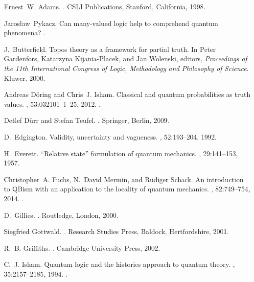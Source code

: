 \documentclass[12pt,reqno]{article}
\renewcommand{\(}{\left(}
\renewcommand{\)}{\right)}
\newcommand{\<}{\langle}
\renewcommand{\>}{\rangle}
\theoremstyle{plain} %
\begin{document}
\begin{thebibliography}{10}

Ernest~W. Adams.
.
\newblock CSLI Publications, Stanford, California, 1998.

Jaros\l aw~Pykacz.
\newblock Can many-valued logic help to comprehend quantum phenomena?
.

J.~Butterfield.
\newblock Topos theory as a framework for partial truth.
\newblock In Peter Gardenfors, Katarzyna Kijania-Placek, and Jan Wolenski,
  editors, {\em Proceedings of the 11th International Congress of Logic,
  Methodology and Philosophy of Science}. Kluwer, 2000.

Andreas D{\"o}ring and Chris~J. Isham.
\newblock Classical and quantum probabilities as truth values.
, 53:032101--1--25, 2012.
.

Detlef D{\"u}rr and Stefan Teufel.
.
\newblock Springer, Berlin, 2009.

D.~Edgington.
\newblock Validity, uncertainty and vagueness.
, 52:193--204, 1992.

H.~Everett.
\newblock ``{R}elative state'' formulation of quantum mechanics.
, 29:141--153, 1957.

Christopher~A. Fuchs, N.~David Mermin, and R{\"u}diger Schack.
\newblock An introduction to {QB}ism with an application to the locality of
  quantum mechanics.
, 82:749--754, 2014.
.

D.~Gillies.
.
\newblock Routledge, London, 2000.

Siegfried Gottwald.
.
\newblock Research Studies Press, Baldock, Hertfordshire, 2001.

R.~B. Griffiths.
.
\newblock Cambridge University Press, 2002.

C.~J. Isham.
\newblock Quantum logic and the histories approach to quantum theory.
, 35:2157--2185, 1994.
.


\end{thebibliography}
\end{document}
